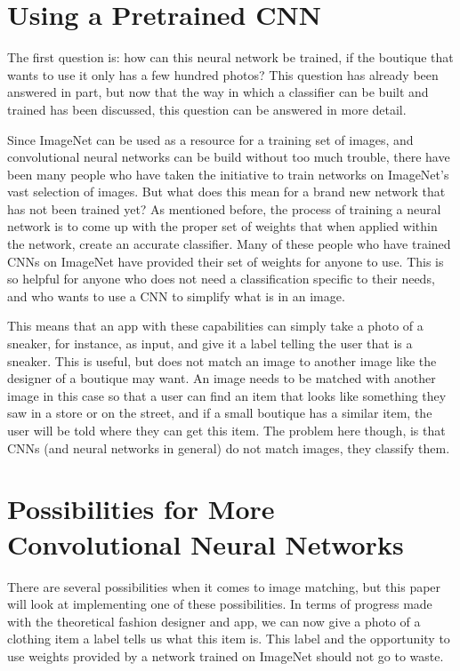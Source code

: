 \documentclass[12pt]{report} %
\begin{document}
\section{Using a Pretrained CNN}
	The first question is: how can this neural network be trained, if the boutique that wants to use it only has a few hundred photos? This question has already been answered in part, but now that the way in which a classifier can be built and trained has been discussed, this question can be answered in more detail. 
	
	Since ImageNet can be used as a resource for a training set of images, and convolutional neural networks can be build without too much trouble, there have been many people who have taken the initiative to train networks on ImageNet's vast selection of images. But what does this mean for a brand new network that has not been trained yet? As mentioned before, the process of training a neural network is to come up with the proper set of weights that when applied within the network, create an accurate classifier. Many of these people who have trained CNNs on ImageNet have provided their set of weights for anyone to use. This is so helpful for anyone who does not need a classification specific to their needs, and who wants to use a CNN to simplify what is in an image. 
	
	This means that an app with these capabilities can simply take a photo of a sneaker, for instance, as input, and give it a label telling the user that is a sneaker. This is useful, but does not match an image to another image like the designer of a boutique may want. An image needs to be matched with another image in this case so that a user can find an item that looks like something they saw in a store or on the street, and if a small boutique has a similar item, the user will be told where they can get this item. The problem here though, is that CNNs (and neural networks in general) do not match images, they classify them. 

\section{Possibilities for More Convolutional Neural Networks}
	There are several possibilities when it comes to image matching, but this paper will look at implementing one of these possibilities. In terms of progress made with the theoretical fashion designer and app, we can now give a photo of a clothing item a label tells us what this item is. This label and the opportunity to use weights provided by a network trained on ImageNet should not go to waste.
	
\end{document}
